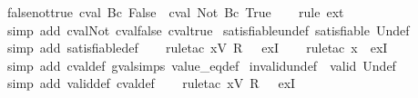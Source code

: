 \begin{isabellebody}
\ false{\isacharunderscore}not{\isacharunderscore}true{\isacharcolon}\ {\isachardoublequoteopen}cval\ {\isacharparenleft}Bc\ False{\isacharparenright}\ {\isacharequal}\ cval\ {\isacharparenleft}Not\ {\isacharparenleft}Bc\ True{\isacharparenright}{\isacharparenright}{\isachardoublequoteclose}\isanewline
%
\isadelimproof
\ \ %
\endisadelimproof
%
\isatagproof
{}\isamarkupfalse%
\ {\isacharparenleft}rule\ ext{\isacharparenright}{\isacharplus}\isanewline
\ \ \isamarkupfalse%
\ {\isacharparenleft}simp\ add{\isacharcolon}\ cval{\isacharunderscore}Not\ cval{\isacharunderscore}false\ cval{\isacharunderscore}true{\isacharparenright}%
\endisatagproof
{\isafoldproof}%
%
\isadelimproof
\isanewline
%
\endisadelimproof
\isanewline
{}\isamarkupfalse%
\ satisfiable{\isacharunderscore}undef{\isacharcolon}\ {\isachardoublequoteopen}satisfiable\ Undef{\isachardoublequoteclose}\isanewline
%
\isadelimproof
\ \ %
\endisadelimproof
%
\isatagproof
{}\isamarkupfalse%
\ {\isacharparenleft}simp\ add{\isacharcolon}\ satisfiable{\isacharunderscore}def{\isacharparenright}\isanewline
\ \ \isamarkupfalse%
\ {\isacharparenleft}rule{\isacharunderscore}tac\ x{\isacharequal}{\isachardoublequoteopen}V\ {\isacharparenleft}R\ {}{\isacharparenright}{\isachardoublequoteclose}\ \ exI{\isacharparenright}\isanewline
\ \ \isamarkupfalse%
\ {\isacharparenleft}rule{\isacharunderscore}tac\ x{\isacharequal}{\isachardoublequoteopen}{\isacharless}{\isachargreater}{\isachardoublequoteclose}\ \ exI{\isacharparenright}\isanewline
\ \ \isamarkupfalse%
\ {\isacharparenleft}simp\ add{\isacharcolon}\ cval{\isacharunderscore}def\ gval{\isachardot}simps\ value_eq{\isacharunderscore}def{\isacharparenright}%
\endisatagproof
{\isafoldproof}%
%
\isadelimproof
\isanewline
%
\endisadelimproof
\isanewline
{}\isamarkupfalse%
\ invalid{\isacharunderscore}undef{\isacharcolon}\ {\isachardoublequoteopen}{\isasymnot}\ valid\ Undef{\isachardoublequoteclose}\isanewline
%
\isadelimproof
\ \ %
\endisadelimproof
%
\isatagproof
{}\isamarkupfalse%
\ {\isacharparenleft}simp\ add{\isacharcolon}\ valid{\isacharunderscore}def\ cval{\isacharunderscore}def{\isacharparenright}\isanewline
\ \ \isamarkupfalse%
\ {\isacharparenleft}rule{\isacharunderscore}tac\ x{\isacharequal}{\isachardoublequoteopen}V\ {\isacharparenleft}R\ {}{\isacharparenright}{\isachardoublequoteclose}\ \ exI{\isacharparenright}\isanewline
\ \ \isamarkupfalse%

\end{isabellebody}
